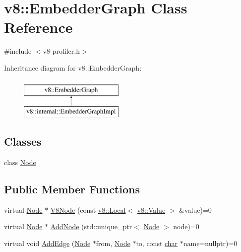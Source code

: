 \hypertarget{classv8_1_1EmbedderGraph}{}\section{v8\+:\+:Embedder\+Graph Class Reference}
\label{classv8_1_1EmbedderGraph}


{\ttfamily \#include $<$v8-\/profiler.\+h$>$}

Inheritance diagram for v8\+:\+:Embedder\+Graph\+:\begin{figure}[H]
\begin{center}
\leavevmode
\includegraphics[height=2.000000cm]{classv8_1_1EmbedderGraph}
\end{center}
\end{figure}
\subsection*{Classes}
\begin{DoxyCompactItemize}
\item 
class \mbox{\hyperlink{classv8_1_1EmbedderGraph_1_1Node}{Node}}
\end{DoxyCompactItemize}
\subsection*{Public Member Functions}
\begin{DoxyCompactItemize}
\item 
virtual \mbox{\hyperlink{classv8_1_1EmbedderGraph_1_1Node}{Node}} $\ast$ \mbox{\hyperlink{classv8_1_1EmbedderGraph_a6fdb5451611738dd44c70d195445d0ff}{V8\+Node}} (const \mbox{\hyperlink{classv8_1_1Local}{v8\+::\+Local}}$<$ \mbox{\hyperlink{classv8_1_1Value}{v8\+::\+Value}} $>$ \&value)=0
\item 
virtual \mbox{\hyperlink{classv8_1_1EmbedderGraph_1_1Node}{Node}} $\ast$ \mbox{\hyperlink{classv8_1_1EmbedderGraph_a57afbce6126e5cd82b66f66b018a18e2}{Add\+Node}} (std\+::unique\+\_\+ptr$<$ \mbox{\hyperlink{classv8_1_1EmbedderGraph_1_1Node}{Node}} $>$ node)=0
\item 
virtual void \mbox{\hyperlink{classv8_1_1EmbedderGraph_a81b1c7dd4d0387ec50037b0778b8af11}{Add\+Edge}} (\mbox{\hyperlink{classv8_1_1EmbedderGraph_1_1Node}{Node}} $\ast$from, \mbox{\hyperlink{classv8_1_1EmbedderGraph_1_1Node}{Node}} $\ast$to, const \mbox{\hyperlink{classchar}{char}} $\ast$name=nullptr)=0
\end{DoxyCompactItemize}


